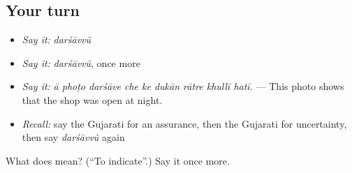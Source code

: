 \subsection*{Your turn}
\begin{itemize}
\raggedright
  \item \emph{Say it:} \emph{darśāvvũ}
  \item \emph{Say it:} \emph{darśāvvũ}, once more
  \item \emph{Say it:} \emph{ā phoṭo darśāve che ke dukān rātre khullī hatī.} — This photo shows that the shop was open at night.
  \item \emph{Recall:} say the Gujarati for an assurance, then the Gujarati for uncertainty, then say \emph{darśāvvũ} again
\end{itemize}

\begin{tcolorbox}[breakable,colback=teal!4,colframe=teal!35!black,title={Before you move on}]
What does  mean? (\textquotedblleft{}To indicate\textquotedblright{}.) Say it once more.
\end{tcolorbox}
